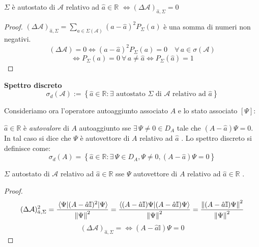 
\begin{theorem}
    \(\Sigma\) è autostato di \(\mathcal{A}\) relativo ad \(\hat{a} \in \mathbb{R}\)   \(\iff (\Delta \mathcal{A})_{\hat{a},\Sigma}=0\)
\end{theorem}
\begin{proof}
    \((\Delta \mathcal{A})_{\hat{a}, \Sigma} = \sum_{a \in \Sigma(\mathcal{A})}(a-\hat{a})^2 P_{\Sigma}(a)\) è una somma di numeri non negativi.
    \[
        (\Delta\mathcal{A}) = 0 \iff (a- \hat{a})^2 P_\Sigma(a)= 0 \quad \forall \, a \in \sigma(\mathcal{A})
    \] 
    \[
        \iff P_\Sigma(a)= 0 \ \forall \, a \neq \hat{a}  \iff P_\Sigma(\hat{a})=1
    \]
\end{proof}

\begin{definition}  
    \textbf{Spettro discreto}
    \begin{equation}
        \sigma_d(\mathcal{A}):= \left\{ \hat{a} \in \mathbb{R} : \exists \text{ autostato } \Sigma \text{ di }\mathcal{A} \text{ relativo ad } \hat{a}\right\}
    \end{equation}
    
\end{definition}

Consideriamo ora l'operatore autoaggiunto associato \(A\) e lo stato associato \([\Psi]\):
\begin{definition}
    \(\hat{a} \in \mathbb{R}\) è \textit{autovalore} di \(A\) autoaggiunto sse \(\exists \,\Psi \neq 0 \in D_A\) tale che \((A-\hat{a})\Psi=0\). \\
    In tal caso si dice che \(\Psi\) è autovettore di \(A\) relativo ad \(\hat{a}\) .
    Lo spettro discreto si definisce come:
    \[
        \sigma_d(A)  = \left\{ \hat{a} \in \mathbb{R} : \exists\, \Psi \in D_A, \Psi \neq 0 , (A-\hat{a})\Psi =0\right\}
    \]
\end{definition}

\begin{theorem}
    \(\Sigma\) autostato di \(\mathcal{A}\) relativo ad \(\hat{a} \in \mathbb{R}\) sse \(\Psi\) autovettore di \(A\) relativo ad \(\hat{a} \in \mathbb{R}\) .
\end{theorem}
\begin{proof}
    \[
        (\Delta \mathcal{A})^2_{\hat{a},\Sigma}= \frac{\expval{(A-\hat{a}\mathbb{I})^2}{\Psi}}{\norm{\Psi}^2}= 
        \frac{\braket{(A-\hat{a}\mathbb{I})\Psi}{(A-\hat{a}\mathbb{I})\Psi}}{\norm{\Psi}^2} = \frac{\norm{(A-\hat{a}\mathbb{I})\Psi}^2}{\norm{\Psi}^2}
    \]
    \[
        (\Delta\mathcal{A})_{\hat{a},\Sigma} = \iff (A-\hat{a}\mathbb{I})\Psi=0 
    \]    
\end{proof}

